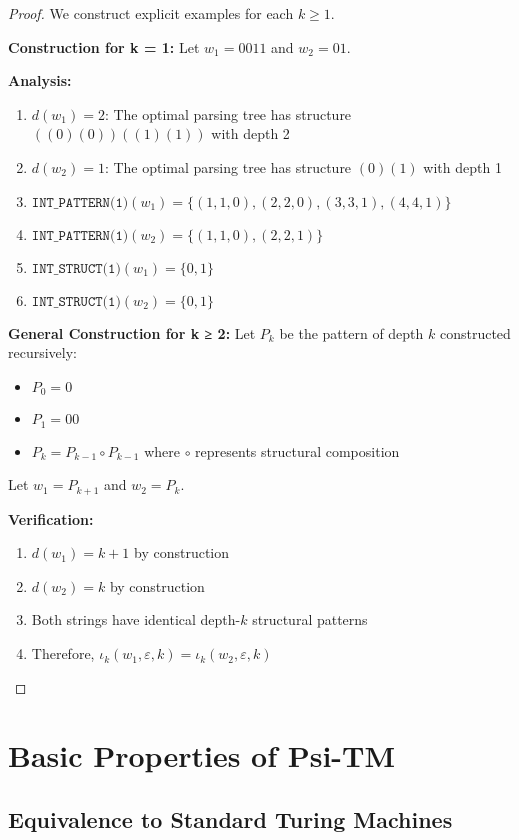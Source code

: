 \documentclass[11pt]{article}
\begin{document}
\begin{proof}
We construct explicit examples for each $k \geq 1$.

\textbf{Construction for k = 1:}
Let $w_1 = 0011$ and $w_2 = 01$.

\textbf{Analysis:}
\begin{enumerate}
\item $d(w_1) = 2$: The optimal parsing tree has structure $((0)(0))((1)(1))$ with depth 2
\item $d(w_2) = 1$: The optimal parsing tree has structure $(0)(1)$ with depth 1
\item $\texttt{INT\_PATTERN(1)}(w_1) = \{(1,1,0), (2,2,0), (3,3,1), (4,4,1)\}$
\item $\texttt{INT\_PATTERN(1)}(w_2) = \{(1,1,0), (2,2,1)\}$
\item $\texttt{INT\_STRUCT(1)}(w_1) = \{0,1\}$
\item $\texttt{INT\_STRUCT(1)}(w_2) = \{0,1\}$
\end{enumerate}

\textbf{General Construction for k ≥ 2:}
Let $P_k$ be the pattern of depth $k$ constructed recursively:
\begin{itemize}
\item $P_0 = 0$
\item $P_1 = 00$
\item $P_k = P_{k-1} \circ P_{k-1}$ where $\circ$ represents structural composition
\end{itemize}

Let $w_1 = P_{k+1}$ and $w_2 = P_k$.

\textbf{Verification:}
\begin{enumerate}
\item $d(w_1) = k+1$ by construction
\item $d(w_2) = k$ by construction
\item Both strings have identical depth-$k$ structural patterns
\item Therefore, $\iota_k(w_1, \varepsilon, k) = \iota_k(w_2, \varepsilon, k)$
\end{enumerate}
\end{proof}

\section{Basic Properties of Psi-TM}

\subsection{Equivalence to Standard Turing Machines}
\end{document}

